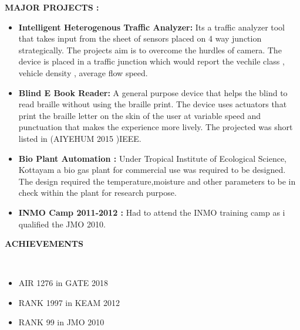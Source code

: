 \documentclass[a4paper,10pt]{article}
\newcommand{\isep}{-2 pt}
\newcommand{\lsep}{-0.5cm}
\newcommand{\resheading}[1]{{\small \colorbox{MyBlue}{\begin{minipage}{0.975\textwidth}{\textbf{#1 \vphantom{p\^{E}}}}\end{minipage}}}}
\begin{document}
\textbf{MAJOR PROJECTS :}
\begin{itemize}\itemsep \isep
\item \textbf{ Intelligent Heterogenous Traffic Analyzer:} Its a traffic analyzer tool that takes input from the sheet of sensors placed on 4 way junction strategically. The projects aim is to overcome the hurdles of camera. The device is placed in a traffic junction which would report the vechile class , vehicle density , average flow speed.

\item \textbf{Blind E Book Reader:} A general purpose device that helps the blind to read braille without using the braille print. The device uses actuators that print the braille letter on the skin of the user at variable speed and punctuation that makes the experience more lively.
The projected was short listed in (AIYEHUM 2015 )IEEE.

\item \textbf{Bio Plant Automation :} Under Tropical Institute of Ecological Science, Kottayam a bio gas plant for commercial use was required to be designed. The design required the temperature,moisture and other parameters to be in check within the plant for research purpose.

\item \textbf{INMO Camp 2011-2012 :} Had to attend the INMO training camp as i qualified the JMO 2010.
\end{itemize}


\resheading{\textbf{ACHIEVEMENTS} }\\[\lsep]
\begin{itemize}
\item \noindent AIR 1276 in GATE 2018
\item \noindent RANK 1997 in KEAM 2012
\item \noindent RANK 99 in JMO 2010
\end{itemize}
\end{document}
